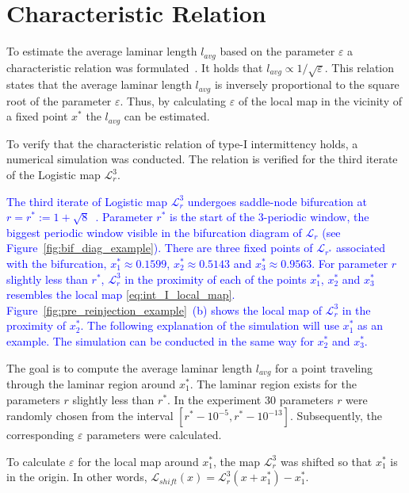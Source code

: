 \section{Characteristic Relation}
To estimate the average laminar length $l_{avg}$ based on the parameter $\varepsilon$ a characteristic relation was formulated~\cite{Elaskar2017}.
It holds that $l_{avg} \propto 1/\sqrt{\varepsilon}$.
This relation states that the average laminar length $l_{avg}$ is inversely proportional to the square root of the parameter $\varepsilon$.
Thus, by calculating $\varepsilon$ of the local map in the vicinity of a fixed point $x^{*}$ the $l_{avg}$ can be estimated.
\par
To verify that the characteristic relation of type-I intermittency holds, a numerical simulation was conducted.
The relation is verified for the third iterate of the Logistic map $\mathcal{L}_{r}^{3}$.
\par
\textcolor{blue}{
The third iterate of Logistic map $\mathcal{L}_{r}^{3}$ undergoes saddle-node bifurcation at $r = r^{*} := 1+\sqrt{8}$~\cite{Elaskar2022,Gordon20180411}.
Parameter $r^{*}$ is the start of the $3$-periodic window, the biggest periodic window visible in the bifurcation diagram of $\mathcal{L}_{r}$ (see Figure~\ref{fig:bif_diag_example}).
There are three fixed points of $\mathcal{L}_{r^{*}}$ associated with the bifurcation, $x^{*}_{1} \approx 0.1599$, $x^{*}_{2} \approx 0.5143$ and $x^{*}_{3} \approx 0.9563$.
For parameter $r$ slightly less than $r^{*}$, $\mathcal{L}_{r}^{3}$ in the proximity of each of the points $x^{*}_{1}$, $x^{*}_{2}$ and $x^{*}_{3}$ resembles the local map \eqref{eq:int_I_local_map}.
Figure~\ref{fig:pre_reinjection_example}~(b) shows the local map of $\mathcal{L}_{r}^{3}$ in the proximity of $x^{*}_{2}$.
The following explanation of the simulation will use $x^{*}_{1}$ as an example.
The simulation can be conducted in the same way for $x^{*}_{2}$ and $x^{*}_{3}$.
}
\par
The goal is to compute the average laminar length $l_{avg}$ for a point traveling through the laminar region around $x^{*}_{1}$.
The laminar region exists for the parameters $r$ slightly less than $r^{*}$.
In the experiment $30$ parameters $r$ were randomly chosen from the interval $[ r^{*}-10^{-5}, r^{*}-10^{-13} ]$.
Subsequently, the corresponding $\varepsilon$ parameters were calculated.
\par
To calculate $\varepsilon$ for the local map around $x^{*}_{1}$, the map $\mathcal{L}_{r}^{3}$ was shifted so that $x^{*}_{1}$ is in the origin.
In other words, $\mathcal{L}_{shift}(x) = \mathcal{L}_{r}^{3}(x + x^{*}_{1}) - x^{*}_{1}$.
